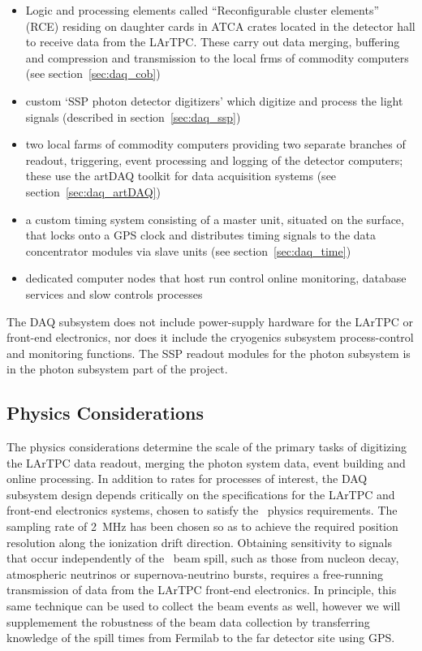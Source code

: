 \begin{itemize}
  \item Logic and processing elements called ``Reconfigurable cluster
    elements'' (RCE) residing on daughter cards in ATCA crates located
    in the detector hall to receive data from the LArTPC.  These carry
    out data merging, buffering and compression and transmission to the
    local frms of commodity computers (see section~\ref{sec:daq_cob})
  \item custom `SSP photon detector digitizers' which digitize and
    process the light signals (described in section~\ref{sec:daq_ssp}) 
  \item two local farms of commodity computers providing two separate
    branches of readout, triggering, event processing and logging of the
    detector computers; these use the artDAQ toolkit for data
    acquisition systems (see section~\ref{sec:daq_artDAQ})
  \item a custom timing system consisting of a master unit, situated
    on the surface, that locks onto a GPS clock and distributes timing
    signals to the data concentrator modules via slave units (see
    section~\ref{sec:daq_time})
  \item dedicated computer nodes that host run control online
    monitoring, database services and slow controls processes
\end{itemize}
%
The DAQ subsystem does not include power-supply hardware for the
LArTPC or front-end electronics, nor does it include the cryogenics
subsystem process-control and monitoring functions.  The SSP readout
modules for the photon subsystem is in the photon subsystem part of
the project.

\subsection{Physics Considerations}
\label{sec:daq_phys}

The physics considerations determine the scale of the primary tasks of
digitizing the LArTPC data readout, merging the photon system data,
event building and online processing.  In addition to rates for
processes of interest, the DAQ subsystem design depends critically on
the specifications for the LArTPC and front-end electronics systems,
chosen to satisfy the \LBNE\ physics requirements.  The sampling rate
of 2~MHz has been chosen so as to achieve the required position
resolution along the ionization drift direction. Obtaining sensitivity
to signals that occur independently of the \LBNE\ beam spill, such as
those from nucleon decay, atmospheric neutrinos or supernova-neutrino
bursts, requires a free-running transmission of data from the LArTPC
front-end electronics.  In principle, this same technique can be used
to collect the beam events as well, however we will supplemement the
robustness of the beam data collection by transferring knowledge of
the spill times from Fermilab to the far detector site using GPS.

